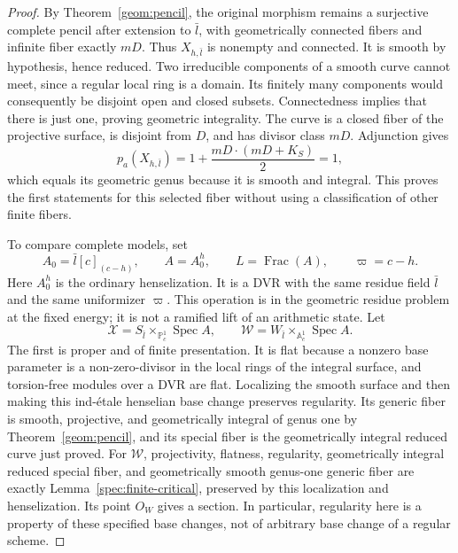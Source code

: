 \begin{proof}
By Theorem~\ref{geom:pencil}, the original morphism remains a
surjective complete pencil after extension to $\bar l$, with
geometrically connected fibers and infinite fiber exactly $mD$.
Thus $X_{h,\bar l}$ is nonempty and connected.  It is smooth by
hypothesis, hence reduced.  Two irreducible components of a smooth
curve cannot meet, since a regular local ring is a domain.  Its
finitely many components would consequently be disjoint open and
closed subsets.  Connectedness implies that there is just one,
proving geometric integrality.  The curve is a closed fiber of the
projective surface, is disjoint from $D$, and has divisor class
$mD$.  Adjunction gives
\[
p_a(X_{h,\bar l})
=1+\frac{mD\cdot(mD+K_S)}2=1,
\]
which equals its geometric genus because it is smooth and integral.
This proves the first statements for this selected fiber without
using a classification of other finite fibers.

To compare complete models, set
\begin{equation}
A_0=\bar l[c]_{(c-h)},\qquad A=A_0^h,\qquad
L=\operatorname{Frac}(A),\qquad \varpi=c-h.
\label{hasse:henselian-base}
\end{equation}
Here $A_0^h$ is the ordinary henselization.  It is a DVR with the
same residue field $\bar l$ and the same uniformizer $\varpi$.
This operation is in the geometric residue problem at the fixed
energy; it is not a ramified lift of an arithmetic state.  Let
\[
\mathcal X=S_{\bar l}\times_{\mathbb P^1_c}\operatorname{Spec}A,
\qquad
\mathcal W=W_{\bar l}\times_{\mathbb A^1_c}\operatorname{Spec}A.
\]
The first is proper and of finite presentation.  It is flat
because a nonzero base parameter is a non-zero-divisor in the local
rings of the integral surface, and torsion-free modules over a DVR
are flat.  Localizing the smooth surface and then making this
ind-\'{e}tale henselian base change preserves regularity.  Its
generic fiber is smooth, projective, and geometrically integral of
genus one by Theorem~\ref{geom:pencil}, and its special fiber is the
geometrically integral reduced curve just proved.  For $\mathcal W$,
projectivity, flatness, regularity, geometrically integral reduced
special fiber, and geometrically smooth genus-one generic fiber
are exactly Lemma~\ref{spec:finite-critical}, preserved by this
localization and henselization.  Its point $O_W$ gives a section.
In particular, regularity here is a property of these specified
base changes, not of arbitrary base change of a regular scheme.


\end{proof}

